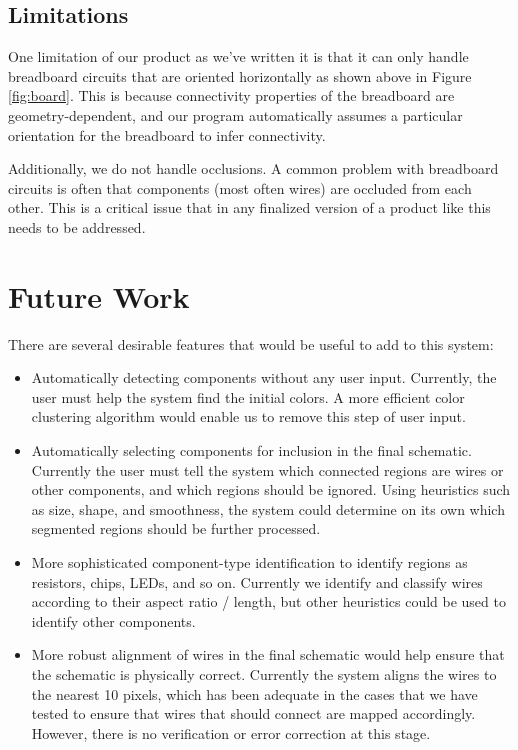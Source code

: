 \documentclass[10pt,twocolumn,letterpaper]{article}
\begin{document}
\subsection{Limitations}

One limitation of our product as we've written it is that it can only handle
breadboard circuits that are oriented horizontally as shown above in Figure
\ref{fig:board}. This is because connectivity properties of the breadboard are
geometry-dependent, and our program automatically assumes a particular
orientation for the breadboard to infer connectivity.  

Additionally, we do not handle occlusions. A common problem with
breadboard circuits is often that components (most often wires) are
occluded from each other. This is a critical issue that in any
finalized version of a product like this needs to be
addressed.

\section{Future Work}

There are several desirable features that would be useful to add to
this system:
\begin{itemize}
\item Automatically detecting components without any user
  input. Currently, the user must help the system find the initial
  colors. A more efficient color clustering algorithm would enable us
  to remove this step of user input.
\item Automatically selecting components for inclusion in the final
  schematic. Currently the user must tell the system which connected
  regions are wires or other components, and which regions should be
  ignored. Using heuristics such as size, shape, and smoothness, the
  system could determine on its own which segmented regions should be
  further processed.
  \item More sophisticated component-type identification to identify
    regions as resistors, chips, LEDs, and so on. Currently we
    identify and classify wires according to their aspect ratio /
    length, but other heuristics could be used to identify other components.
  \item More robust alignment of wires in the final schematic
    would help ensure that the schematic is physically
    correct. Currently the system aligns the wires to the nearest 10
    pixels, which has been adequate in the cases that we have tested to
    ensure that wires that should connect are mapped
    accordingly. However, there is no verification or error correction
    at this stage.
\end{itemize}
\end{document}
